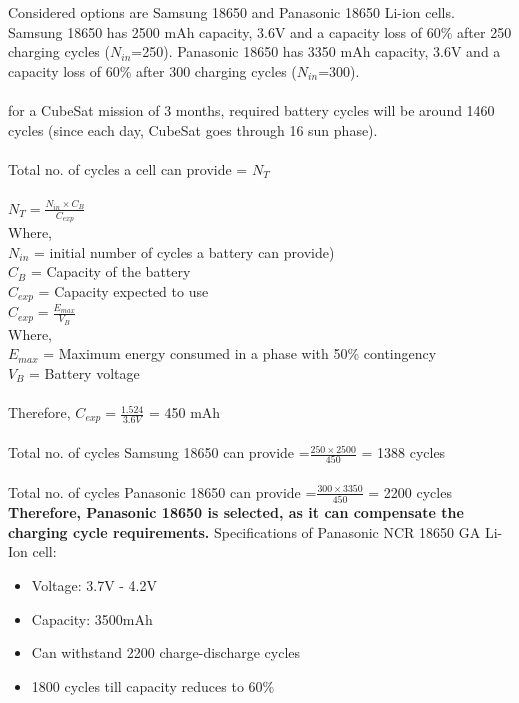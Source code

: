 Considered options are Samsung 18650 and Panasonic 18650 Li-ion cells. Samsung 18650 has 2500 mAh capacity, 3.6V and a capacity loss of 60\% after 250 charging cycles ($N_{in}$=250). Panasonic 18650 has 3350 mAh capacity, 3.6V and a capacity loss of 60\% after 300 charging cycles ($N_{in}$=300).\\ \\
for a CubeSat mission of 3 months, required battery cycles will be around 1460 cycles (since each day, CubeSat goes through 16 sun phase).\\ \\
Total no. of cycles a cell can provide = $N_{T}$\\ \\
\hspace*{3cm} $N_{T} = \frac{N_{in} \times C_{B}}{C_{exp}}$
\\ 
Where,\\
$N_{in}$ = initial number of cycles a battery can provide)
\\ $C_{B}$ = Capacity of the battery
\\ $C_{exp}$ = Capacity expected to use\\
\hspace*{3cm} $C_{exp} = \frac{E_{max}}{V_{B}}$
\\ Where,\\
 $E_{max}$ = Maximum energy consumed in a phase with 50\% contingency
\\ $V_{B}$ = Battery voltage\\ \\
Therefore, $C_{exp} = \frac{1.524}{3.6V}$ = 450 mAh \\ \\
Total no. of cycles Samsung 18650 can provide =$\frac{250 \times 2500}{450}$ = 1388 cycles\\ \\
Total no. of cycles Panasonic 18650 can provide =$\frac{300 \times 3350}{450}$ = 2200 cycles\\ 

\textbf{Therefore, Panasonic 18650 is selected, as it can compensate the charging cycle requirements.}
Specifications of Panasonic NCR 18650 GA Li-Ion cell:
\begin{itemize}
	\item Voltage: 3.7V - 4.2V
	\item Capacity: 3500mAh
	\item Can withstand 2200 charge-discharge cycles
	\item 1800 cycles till capacity reduces to 60\%
\end{itemize}
